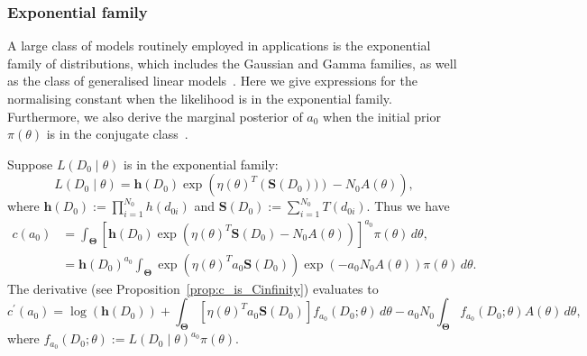 \documentclass[a4paper, notitlepage, 11pt]{article}
\begin{document}
\subsubsection{Exponential family}
\label{sec:expo_family}

A large class of models routinely employed in applications is the exponential family of distributions, which includes the Gaussian and Gamma families, as well as the class of generalised linear models~\citep{Nelder1972, Mccullagh1989}.
Here we give expressions for the normalising constant when the likelihood is in the exponential family.
Furthermore, we also derive the marginal posterior of $a_0$ when the initial prior $\pi(\theta)$ is in the conjugate class~\citep{Diaconis1979}. 

Suppose $L(D_0 \mid \theta)$ is in the exponential family:
\begin{equation*}
 L(D_0 \mid \theta) = \boldsymbol h(D_0) \exp \left( \eta(\theta)^T \left(\boldsymbol S(D_0)) \right) - N_0 A(\theta) \right),
\end{equation*}
where $\boldsymbol h(D_0) := \prod_{i = 1}^{N_0} h(d_{0i})$ and $\boldsymbol S(D_0) :=  \sum_{i=1}^{N_0} T(d_{0i})$.
Thus we have
\begin{align}
\nonumber
 c(a_0) &=  \int_{\boldsymbol\Theta} \left[ \boldsymbol h(D_0) \exp \left( \eta(\theta)^T \boldsymbol S(D_0) - N_0 A(\theta) \right) \right]^{a_0}\pi(\theta) \, d\theta, \\
  \label{eq:expo_family_const}
 &= \boldsymbol h(D_0)^{a_0}\int_{\boldsymbol\Theta} \exp \left( \eta(\theta)^T a_0 \boldsymbol S(D_0) \right) \exp\left(- a_0N_0 A(\theta) \right) \pi(\theta) \, d\theta.
\end{align}
The derivative (see Proposition~\ref{prop:c_is_Cinfinity}) evaluates to 
\begin{equation}
\label{eq:expo_family_deriv_general}
 c^\prime(a_0) = \log(\boldsymbol h(D_0)) +  \int_{\boldsymbol\Theta} \left[ \eta(\theta)^T a_0 \boldsymbol S(D_0) \right]  f_{a_0}(D_0; \theta) \, d\theta -  a_0N_0\int_{\boldsymbol\Theta} f_{a_0}(D_0; \theta)  A(\theta) \, d\theta,
\end{equation}
where $f_{a_0}(D_0; \theta) := L(D_0 \mid \theta)^{a_0}\pi(\theta)$.
\end{document}
